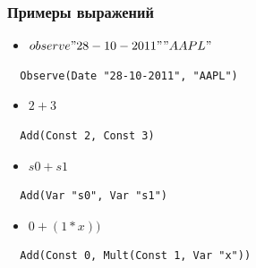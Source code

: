 \documentclass{beamer}
\begin{document}
\begin{frame}[fragile]
\frametitle{Примеры выражений}

\begin{itemize}
\item $observe "28-10-2011" "AAPL"$
\end{itemize}
\begin{lstlisting}
  Observe(Date "28-10-2011", "AAPL")
\end{lstlisting}
\begin{itemize}
\item $2 + 3$
\end{itemize}
\begin{lstlisting}
  Add(Const 2, Const 3)
\end{lstlisting}
\begin{itemize}
\item $s0 + s1$
\end{itemize}
\begin{lstlisting}
  Add(Var "s0", Var "s1")
\end{lstlisting}
\begin{itemize}
\item $0 + (1 * x))$
\end{itemize}
\begin{lstlisting}
  Add(Const 0, Mult(Const 1, Var "x"))
\end{lstlisting}
\end{frame}
\end{document}
